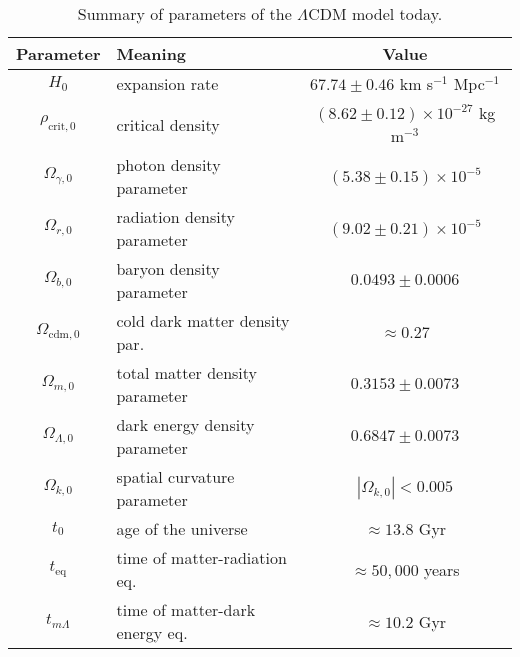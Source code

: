 \begin{table}[h]
    \centering
    \begin{tabular}{|c|p{6cm}|c|}
    \hline
    \textbf{Parameter} & \textbf{Meaning} & \textbf{Value} \\ \hline \hline
    $H_0$ & \raggedright expansion rate & $67.74 \pm 0.46$ km s$^{-1}$ Mpc$^{-1}$ \\ 
    $\rho_{\text{crit},0}$ & \raggedright critical density & $(8.62 \pm 0.12) \times 10^{-27}$ kg m$^{-3}$ \\  \hline
    $\Omega_{\gamma,0}$ & \raggedright photon density parameter & $(5.38 \pm 0.15) \times 10^{-5}$ \\ 
    $\Omega_{r,0}$ & \raggedright radiation density parameter & $(9.02 \pm 0.21) \times 10^{-5}$ \\ 
    $\Omega_{b,0}$ & \raggedright baryon density parameter & $0.0493 \pm 0.0006$ \\
    $\Omega_{\text{cdm},0}$ & \raggedright cold dark matter density par. & $\approx 0.27$ \\ 
    $\Omega_{m,0}$ & \raggedright total matter density parameter & $0.3153 \pm 0.0073$ \\ 
    $\Omega_{\Lambda,0}$ & \raggedright dark energy density parameter & $0.6847 \pm 0.0073$ \\ 
    $\Omega_{k,0}$ & \raggedright spatial curvature parameter & $|\Omega_{k,0}| < 0.005$ \\ \hline 
    $t_0$ & \raggedright age of the universe & $\approx 13.8$ Gyr \\ 
    $t_\text{eq}$ & \raggedright time of matter-radiation eq. & $\approx 50,000$ years \\ 
    $t_{m\Lambda}$ & \raggedright time of matter-dark energy eq. & $\approx 10.2$ Gyr \\ \hline
    \end{tabular}
    \caption{Summary of parameters of the $\Lambda$CDM model today.}
    \label{tab:LambdaCDM}
\end{table}

